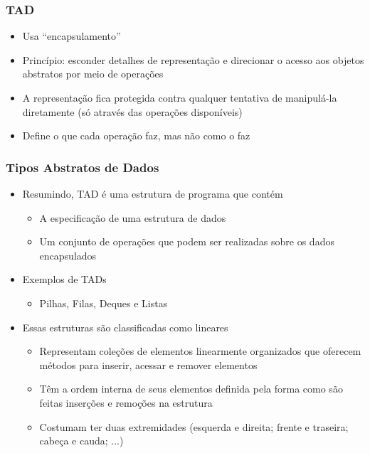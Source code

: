 \documentclass[aspectratio=169]{beamer}
\begin{document}
\begin{frame}\frametitle{TAD}
\begin{itemize}
	\item Usa ``encapsulamento''
	\item Princípio: esconder detalhes de representação e direcionar o acesso aos objetos abstratos por meio de operações
	\item A representação fica protegida contra qualquer tentativa de manipulá-la diretamente (só através das operações disponíveis)
	\item Define o que cada operação faz, mas não como o faz
\end{itemize}
\end{frame}

\begin{frame}\frametitle{Tipos Abstratos de Dados}
\begin{itemize}
	\item Resumindo, TAD é uma estrutura de programa que contém
	\begin{itemize}
		\item A especificação de uma estrutura de dados
		\item Um conjunto de operações que podem ser realizadas sobre os dados encapsulados
	\end{itemize}
	\item Exemplos de TADs
	\begin{itemize}
		\item Pilhas, Filas, Deques e Listas
	\end{itemize}
	\item Essas estruturas são classificadas como lineares
	\begin{itemize}
		\item Representam coleções de elementos linearmente organizados que oferecem métodos para inserir, acessar e remover elementos
		\item Têm a ordem interna de seus elementos definida pela forma como são feitas inserções e remoções na estrutura
		\item Costumam ter duas extremidades (esquerda e direita; frente e traseira; cabeça e cauda; ...)
	\end{itemize}
\end{itemize}
\end{frame}
\end{document}
